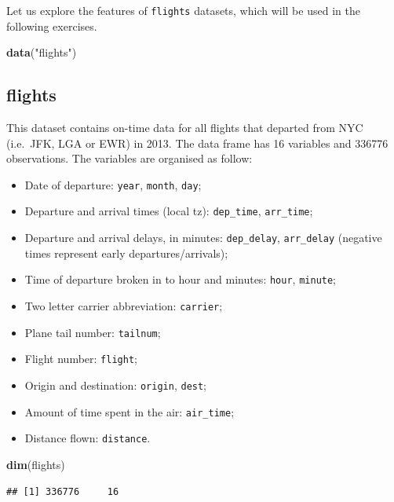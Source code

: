 \documentclass[]{book}
\newenvironment{Shaded}{\begin{snugshade}}{\end{snugshade}}
\newcommand{\KeywordTok}[1]{\textcolor[rgb]{0.13,0.29,0.53}{\textbf{{#1}}}}
\newcommand{\StringTok}[1]{\textcolor[rgb]{0.31,0.60,0.02}{{#1}}}
\newcommand{\NormalTok}[1]{{#1}}
\providecommand{\tightlist}{%
  \setlength{\itemsep}{0pt}\setlength{\parskip}{0pt}}
\def\tightlist{}
\begin{document}
Let us explore the features of \texttt{flights} datasets, which will be
used in the following exercises.

\begin{Shaded}
\begin{Highlighting}[]
\KeywordTok{data}\NormalTok{(}\StringTok{"flights"}\NormalTok{)}
\end{Highlighting}
\end{Shaded}

\subsection{flights}\label{flights}

This dataset contains on-time data for all flights that departed from
NYC (i.e.~JFK, LGA or EWR) in 2013. The data frame has 16 variables and
336776 observations. The variables are organised as follow:

\begin{itemize}
\tightlist
\item
  Date of departure: \texttt{year}, \texttt{month}, \texttt{day};
\item
  Departure and arrival times (local tz): \texttt{dep\_time},
  \texttt{arr\_time};
\item
  Departure and arrival delays, in minutes: \texttt{dep\_delay},
  \texttt{arr\_delay} (negative times represent early
  departures/arrivals);
\item
  Time of departure broken in to hour and minutes: \texttt{hour},
  \texttt{minute};
\item
  Two letter carrier abbreviation: \texttt{carrier};
\item
  Plane tail number: \texttt{tailnum};
\item
  Flight number: \texttt{flight};
\item
  Origin and destination: \texttt{origin}, \texttt{dest};
\item
  Amount of time spent in the air: \texttt{air\_time};
\item
  Distance flown: \texttt{distance}.
\end{itemize}

\begin{Shaded}
\begin{Highlighting}[]
\KeywordTok{dim}\NormalTok{(flights)}
\end{Highlighting}
\end{Shaded}

\begin{verbatim}
## [1] 336776     16
\end{verbatim}
\end{document}
